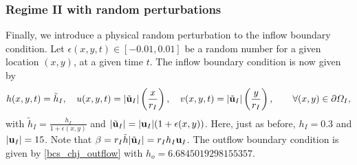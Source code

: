 \documentclass[preprint, 11pt]{article}
\newcommand{\bfu}{{\bf u}}
\begin{document}
\subsubsection{Regime II with random perturbations}
Finally, we introduce a physical random perturbation to the inflow boundary condition.
Let $\epsilon(x,y,t)\in[-0.01,0.01]$ be a random number for a given location $(x,y)$,
at a given time $t$. 
The inflow boundary condition is now given by
\begin{subequations}
  \begin{align}
    h(x,y,t)=\tilde h_I, \quad
    u(x,y,t)=|\tilde \bfu_I| \left(\frac{x}{r_I}\right), \quad
    v(x,y,t)=|\tilde \bfu_I| \left(\frac{y}{r_I}\right), \qquad \forall (x,y)\in\partial\Omega_I,
  \end{align}
\end{subequations}
with $\tilde h_I = \frac{h_I}{1+\epsilon(x,y)}$ and $|\tilde\bfu_I|=|\bfu_I|(1+\epsilon(x,y))$.
Here, just as before, $h_I=0.3$ and $|\bfu_I|=15$. 
Note that $\beta=r_I\tilde h|\tilde\bfu_I|=r_Ih_I\bfu_I$.
The outflow boundary condition is given by
\eqref{bcs_chj_outflow} with $h_o=6.6845019298155357$.
\end{document}
